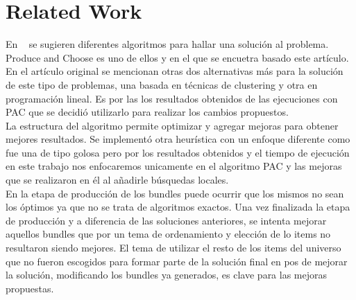 \section{Related Work}
En ~\cite{compositeRetrival} se sugieren diferentes algoritmos para hallar una solución al problema. Produce and Choose es uno de ellos y en el que se encuetra basado este artículo. En el artículo original se mencionan otras dos alternativas más para la solución de este tipo de problemas, una basada en técnicas de clustering y otra en programación lineal. Es por las los resultados obtenidos de las ejecuciones con PAC que se decidió utilizarlo para realizar los cambios propuestos.\\
La estructura del algoritmo permite optimizar y agregar mejoras para obtener mejores resultados. Se implementó otra heurística con un enfoque diferente como fue una de tipo golosa pero por los resultados obtenidos y el tiempo de ejecución en este trabajo nos enfocaremos unicamente en el algoritmo PAC y las mejoras que se realizaron en él al añadirle búsquedas locales.\\
En la etapa de producción de los bundles puede ocurrir que los mismos no sean los óptimos ya que no se trata de algoritmos exactos. Una vez finalizada la etapa de producción y a diferencia de las soluciones anteriores, se intenta mejorar aquellos bundles que por un tema de ordenamiento y elección de lo items no resultaron siendo mejores. El tema de utilizar el resto de los items del universo que no fueron escogidos para formar parte de la solución final en pos de mejorar la solución, modificando los bundles ya generados, es clave para las mejoras propuestas.
